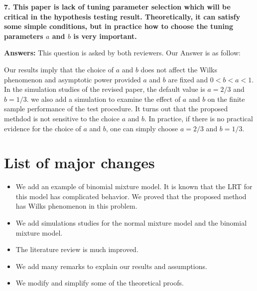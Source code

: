 \documentclass[11pt]{article}
\theoremstyle{plain}
\theoremstyle{definition}
\theoremstyle{remark}
\begin{document}
\textbf{
    7. This paper is lack of tuning parameter selection which will be critical in the hypothesis testing result.
    Theoretically, it can satisfy some simple conditions, but in practice how to choose the tuning parameters $a$ and $b$ is very important.
}

\textbf{Answers:}
This question is asked by both reviewers.
Our Answer is as follow:

Our results imply that the choice of $a$ and $b$ does not affect the Wilks phenomenon and asymptotic power provided $a$ and $b$ are fixed and $0<b<a<1$.
In the simulation studies of the revised paper, the default value is $a=2/3$ and $b= 1/3$.
we also add a simulation to examine the effect of $a$ and $b$ on the finite sample performance of the test procedure.
It turns out that the proposed methdod is not sensitive to the choice $a$ and $b$.
In practice, if there is no practical evidence for the choice of $a$ and $b$, one can simply choose $a = 2/3$ and $b = 1/3$.




\section{List of major changes}
\begin{itemize}
    \item 
We add an example of binomial mixture model.
It is known that the LRT for this model has complicated behavior.
We proved that the proposed method has Wilks phenomenon in this problem.
    \item
        We add simulations studies for the normal mixture model and the binomial mixture model.
    \item
        The literature review is much improved.
    \item
        We add many remarks to explain our results and assumptions.
    \item
        We modify and simplify some of the theoretical proofs.
\end{itemize}






\end{document}
